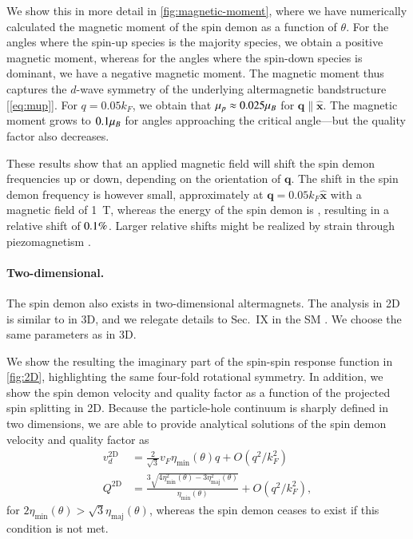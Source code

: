\documentclass[aps,prl,reprint,twocolumns,superscriptaddress]{revtex4-2}
\newcommand{\xx}{\hat{\bm{x}}}
\newcommand{\kF}{k_{F}}
\newcommand{\vs}{v_d}
\begin{document}
	We show this in more detail in \cref{fig:magnetic-moment}, where we have numerically calculated the magnetic moment of the spin demon as a function of $\theta$. For the angles where the spin-up species is the majority species, we obtain a positive magnetic moment, whereas for the angles where the spin-down species is dominant, we have a negative magnetic moment. The magnetic moment thus captures the $d$-wave symmetry of the underlying altermagnetic bandstructure [\cref{eq:mup}]. For $q=0.05\kF$, we obtain that $\mu_p\approx0.025\mu_B$ for $\bm q\parallel \xx$. The magnetic moment grows to $0.1\mu_B$ for angles approaching the critical angle---but the quality factor also decreases. 
	
	These results show that an applied magnetic field will shift the spin demon frequencies up or down, depending on the orientation of $\bm q$. The shift in the spin demon frequency is however small, approximately \muBShift at $\bm q=0.05k_F\hat{\bm x}$ with a magnetic field of \SI{1}{T}, whereas the energy of the spin demon is \demonenergy, resulting in a relative shift of $0.1\%$. Larger relative shifts might be realized by strain through piezomagnetism \cite{aoyamaPiezomagneticPropertiesAltermagnetic2024}.
	
	
	
	
	\paragraph{Two-dimensional.}
	The spin demon also exists in two-dimensional altermagnets. The analysis in 2D is similar to in 3D, and we relegate details to Sec.~IX in the SM \cite{Note1}. We choose the same parameters as in 3D.
	
	We show the resulting the imaginary part of the spin-spin response function in \cref{fig:2D}, highlighting the same four-fold rotational symmetry. 
	In addition, we show the spin demon velocity and quality factor as a function of the projected spin splitting in 2D. Because the particle-hole continuum is sharply defined in two dimensions,  we are able to provide analytical solutions of the spin demon velocity and quality factor as \cite{agarwalLonglivedSpinPlasmons2014}
	\begin{align}
		\vs^{\mathrm{2D}} &= \frac{2}{\sqrt{3}} v_F \eta_{\mathrm{min}}(\theta) q + O(q^2/\kF^2)\\
		Q^{\mathrm{2D}} &= \frac{3\sqrt{4\eta_{\mathrm{min}}^2(\theta)-3\eta_{\mathrm{maj}}^2(\theta)}}{\eta_{\mathrm{min}}(\theta)} + O(q^2/\kF^2),
	\end{align}
	for $2\eta_{\mathrm{min}}(\theta)>\sqrt{3}\eta_{\mathrm{maj}}(\theta)$, whereas the spin demon ceases to exist if this condition is not met. 
	
\end{document}
